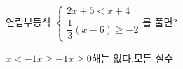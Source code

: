 연립부등식 $\begin{cases} 2x+5<x+4 \\[2pt] \dfrac{1}{3}(x-6)\ge -2 \end{cases}$를 풀면?
\begin{choices32}{$x<-1$}{$x\ge -1$}{$x\ge 0$}{해는 없다.}{모든 실수}\end{choices32}
